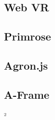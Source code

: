 \subsection{Web VR}
\label{subsec:Web VR}

\subsection{Primrose}
\label{subsec:Primrose}

\subsection{Agron.js}
\label{subsec:Agron.js}

\subsection{A-Frame}
\label{subsec:A-Frame}²


